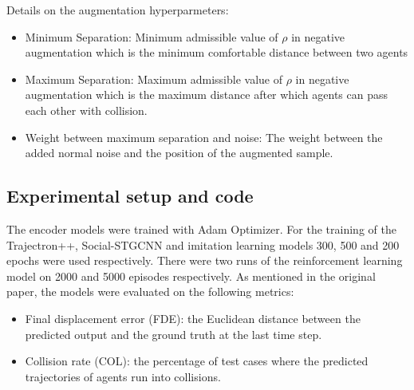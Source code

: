 \begin{table}[H]
\caption{Search on hyperparameters of data augmentation}
\centering %
\label{tab:hresult}
\end{table}

Details on the augmentation hyperparmeters:
\begin{itemize}
    \item Minimum Separation: Minimum admissible value of $\rho$ in negative augmentation which is the minimum comfortable distance between two agents
    \item Maximum Separation: Maximum admissible value of $\rho$ in negative augmentation which is the maximum distance after which agents can pass each other with collision.
    \item Weight between maximum separation and noise: The weight between the added normal noise and the position of the augmented sample.
\end{itemize}

\subsection{Experimental setup and code}
The encoder models were trained with Adam Optimizer. For the training of the Trajectron++, Social-STGCNN and imitation learning models 300, 500 and 200 epochs were used respectively. There were two runs of the reinforcement learning model on 2000 and 5000 episodes respectively. As mentioned in the original paper, the models were evaluated on the following metrics:
\begin{itemize}
  \item Final displacement error (FDE): the Euclidean distance between the predicted output and the ground truth at the last time step.
  \item Collision rate (COL): the percentage of test cases where the predicted trajectories of agents run into collisions.
\end{itemize}


